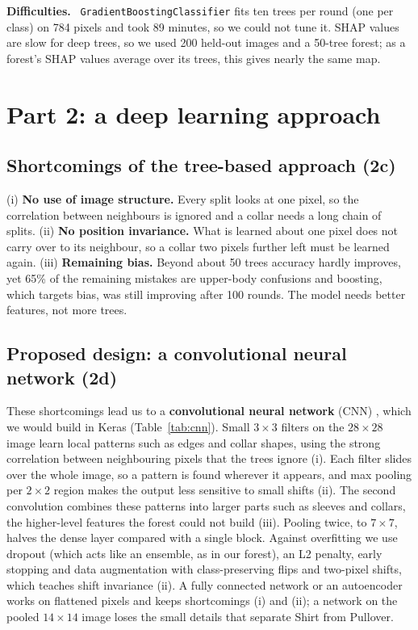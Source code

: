 \documentclass[11pt,a4paper]{article}
\newcommand{\pkg}[1]{\texttt{#1}}
\newcommand{\para}[1]{\textbf{#1}\ }
\begin{document}
\para{Difficulties.} \pkg{GradientBoostingClassifier} fits ten trees per round (one per class) on 784 pixels and took 89 minutes, so we could not tune it. SHAP values are slow for deep trees, so we used 200 held-out images and a 50-tree forest; as a forest's SHAP values average over its trees, this gives nearly the same map.

\section{Part 2: a deep learning approach}
\subsection{Shortcomings of the tree-based approach (2c)}
(i) \textbf{No use of image structure.} Every split looks at one pixel, so the correlation between neighbours is ignored and a collar needs a long chain of splits. (ii) \textbf{No position invariance.} What is learned about one pixel does not carry over to its neighbour, so a collar two pixels further left must be learned again. (iii) \textbf{Remaining bias.} Beyond about 50 trees accuracy hardly improves, yet 65\% of the remaining mistakes are upper-body confusions and boosting, which targets bias, was still improving after 100 rounds. The model needs better features, not more trees.

\subsection{Proposed design: a convolutional neural network (2d)}
These shortcomings lead us to a \textbf{convolutional neural network} (CNN) \citep{lecun1998}, which we would build in Keras (Table~\ref{tab:cnn}). Small $3\times3$ filters on the $28\times28$ image learn local patterns such as edges and collar shapes, using the strong correlation between neighbouring pixels that the trees ignore (i). Each filter slides over the whole image, so a pattern is found wherever it appears, and max pooling per $2\times2$ region makes the output less sensitive to small shifts (ii). The second convolution combines these patterns into larger parts such as sleeves and collars, the higher-level features the forest could not build (iii). Pooling twice, to $7\times7$, halves the dense layer compared with a single block. Against overfitting we use dropout (which acts like an ensemble, as in our forest), an L2 penalty, early stopping and data augmentation with class-preserving flips and two-pixel shifts, which teaches shift invariance (ii). A fully connected network or an autoencoder works on flattened pixels and keeps shortcomings (i) and (ii); a network on the pooled $14\times14$ image loses the small details that separate Shirt from Pullover.
\end{document}
